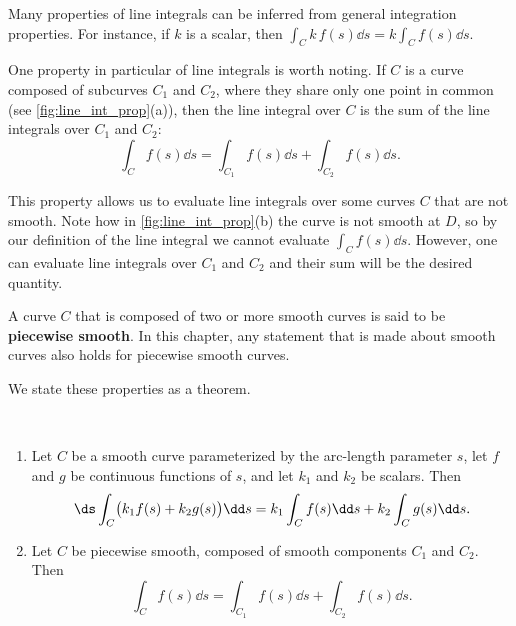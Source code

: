 Many properties of line integrals can be inferred from general integration properties. For instance, if $k$ is a scalar, then $\int_C k\,f(s)\dd s = k\int_Cf(s)\dd s$.

One property in particular of line integrals is worth noting. If $C$ is a curve composed of subcurves $C_1$ and $C_2$, where they share only one point in common (see \autoref{fig:line_int_prop}(a)), then the line integral over $C$ is the sum of the line integrals over $C_1$ and $C_2$: 
\[\int_Cf(s)\dd s = \int_{C_1}f(s)\dd s+\int_{C_2}f(s)\dd s.\]

This property allows us to evaluate line integrals over some curves $C$ that are not smooth. Note how in \autoref{fig:line_int_prop}(b) the curve is not smooth at $D$, so by our definition of the line integral we cannot evaluate $\int_C f(s)\dd s$. However, one can evaluate line integrals over $C_1$ and $C_2$ and their sum will be the desired quantity.

A curve $C$ that is composed of two or more smooth curves is said to be \textbf{piecewise smooth}. In this chapter, any statement that is made about smooth curves also holds for piecewise smooth curves.


We state these properties as a theorem.

\begin{theorem}\label{thm:line_int_properties_scalar}
%
\mbox{}\\[-2\baselineskip]\parbox[t]{\linewidth}{\begin{enumerate}
	\item	Let $C$ be a smooth curve parameterized by the arc-length parameter $s$, let $f$ and $g$ be continuous functions of $s$, and let $k_1$ and $k_2$ be scalars. Then
\[\ds \int_C\bigl(k_1f(s)+k_2g(s)\bigr)\dd s = k_1\int_Cf(s)\dd s +k_2\int_Cg(s)\dd s.\]
	\item Let $C$ be piecewise smooth, composed of smooth components $C_1$ and $C_2$. Then
\[\int_Cf(s)\dd s = \int_{C_1}f(s)\dd s + \int_{C_2}f(s)\dd s.\]
\end{enumerate}}
\end{theorem}

